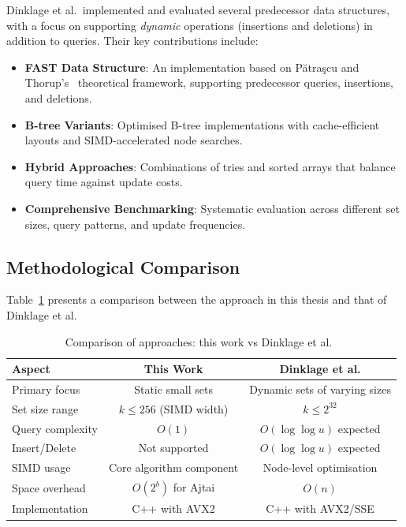 Dinklage et al.\ implemented and evaluated several predecessor data structures, with a focus on supporting \textit{dynamic} operations (insertions and deletions) in addition to queries. Their key contributions include:

\begin{itemize}
    \item \textbf{FAST Data Structure}: An implementation based on P\u{a}tra\c{s}cu and Thorup's~\cite{Patrascu_2014} theoretical framework, supporting predecessor queries, insertions, and deletions.

    \item \textbf{B-tree Variants}: Optimised B-tree implementations with cache-efficient layouts and SIMD-accelerated node searches.

    \item \textbf{Hybrid Approaches}: Combinations of tries and sorted arrays that balance query time against update costs.

    \item \textbf{Comprehensive Benchmarking}: Systematic evaluation across different set sizes, query patterns, and update frequencies.
\end{itemize}

\subsection{Methodological Comparison}

Table~\ref{tab:dinklage-comparison} presents a comparison between the approach in this thesis and that of Dinklage et al.

\begin{table}[H]
\centering
\begin{tabular}{|l|c|c|}
\hline
\textbf{Aspect} & \textbf{This Work} & \textbf{Dinklage et al.} \\
\hline
Primary focus & Static small sets & Dynamic sets of varying sizes \\
Set size range & $k \leq 256$ (SIMD width) & $k \leq 2^{32}$ \\
Query complexity & $O(1)$ & $O(\log \log u)$ expected \\
Insert/Delete & Not supported & $O(\log \log u)$ expected \\
SIMD usage & Core algorithm component & Node-level optimisation \\
Space overhead & $O(2^b)$ for Ajtai & $O(n)$ \\
Implementation & C++ with AVX2 & C++ with AVX2/SSE \\
\hline
\end{tabular}
\caption{Comparison of approaches: this work vs Dinklage et al.~\cite{Patrick_2021}}
\label{tab:dinklage-comparison}
\end{table}

